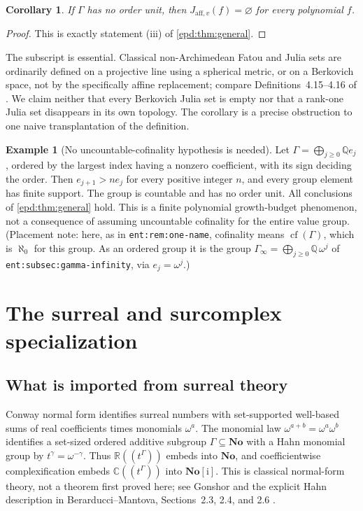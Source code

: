 \documentclass[11pt,a4paper]{article}
\numberwithin{equation}{section}
\theoremstyle{plain}
\newtheorem{corollary}[corollary]{Corollary}
\theoremstyle{definition}
\newtheorem{example}[example]{Example}
\theoremstyle{remark}
\newcommand{\No}{\mathbf{No}}
\newcommand{\SC}{\No[\mathrm i]}
\newcommand{\R}{\mathbb R}
\newcommand{\C}{\mathbb C}
\newcommand{\Q}{\mathbb Q}
\begin{document}
\begin{corollary}\label{epd:cor:empty-affine}
If $\Gamma$ has no order unit, then $J_{\mathrm{aff},v}(f)=\varnothing$
for every polynomial $f$.
\end{corollary}
\begin{proof}
This is exactly statement (iii) of \cref{epd:thm:general}.
\end{proof}

The subscript is essential. Classical non-Archimedean Fatou and Julia
sets are ordinarily defined on a projective line using a spherical
metric, or on a Berkovich space, not by the specifically affine
replacement; compare Definitions~4.15--4.16 of \cite{Benedetto}.
We claim neither that every Berkovich Julia set is empty nor that a
rank-one Julia set disappears in its own topology. The corollary is a
precise obstruction to one naive transplantation of the definition.

\begin{example}[No uncountable-cofinality hypothesis is needed]\label{epd:ex:no-order-unit}
Let $\Gamma=\bigoplus_{j\geq0}\Q e_j$, ordered by the largest index
having a nonzero coefficient, with its sign deciding the order.
Then $e_{j+1}>ne_j$ for every positive integer $n$, and every group
element has finite support. The group is countable and has no order
unit. All conclusions of \cref{epd:thm:general} hold. This is a finite
polynomial growth-budget phenomenon, not a consequence of assuming
uncountable cofinality for the entire value group.
(Placement note: here, as in \texttt{ent:rem:one-name}, cofinality means
$\operatorname{cf}(\Gamma)$, which is $\aleph_0$ for this group. As an
ordered group it is the group $\Gamma_\infty=\bigoplus_{j\geq0}\Q\,\omega^j$
of \texttt{ent:subsec:gamma-infinity}, via $e_j=\omega^j$.)
\end{example}

\section{The surreal and surcomplex specialization}
\label{epd:sec:surreal}
\subsection{What is imported from surreal theory}
Conway normal form identifies surreal numbers with set-supported
well-based sums of real coefficients times monomials $\omega^a$.
The monomial law $\omega^{a+b}=\omega^a\omega^b$ identifies a
set-sized ordered additive subgroup $\Gamma\subseteq\No$ with a
Hahn monomial group by $t^\gamma=\omega^{-\gamma}$. Thus
$\R((t^\Gamma))$ embeds into $\No$, and coefficientwise
complexification embeds $\C((t^\Gamma))$ into $\SC$.
This is classical normal-form theory, not a theorem first proved here;
see Gonshor \cite{Gonshor} and the explicit Hahn description in
Berarducci--Mantova, Sections~2.3, 2.4, and 2.6 \cite{BM}.
\end{document}
